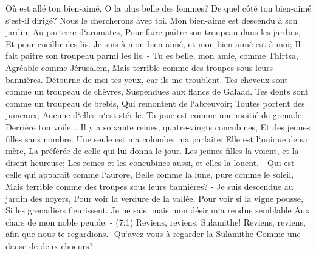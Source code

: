 \verse Où est allé ton bien-aimé, O la plus belle des femmes? De quel côté ton bien-aimé s`est-il dirigé? Nous le chercherons avec toi. 
\verse Mon bien-aimé est descendu à son jardin, Au parterre d`aromates, Pour faire paître son troupeau dans les jardins, Et pour cueillir des lis. 
\verse Je suis à mon bien-aimé, et mon bien-aimé est à moi; Il fait paître son troupeau parmi les lis. - 
\verse Tu es belle, mon amie, comme Thirtsa, Agréable comme Jérusalem, Mais terrible comme des troupes sous leurs bannières. 
\verse Détourne de moi tes yeux, car ils me troublent. Tes cheveux sont comme un troupeau de chèvres, Suspendues aux flancs de Galaad. 
\verse Tes dents sont comme un troupeau de brebis, Qui remontent de l`abreuvoir; Toutes portent des jumeaux, Aucune d`elles n`est stérile. 
\verse Ta joue est comme une moitié de grenade, Derrière ton voile... 
\verse Il y a soixante reines, quatre-vingts concubines, Et des jeunes filles sans nombre. 
\verse Une seule est ma colombe, ma parfaite; Elle est l`unique de sa mère, La préférée de celle qui lui donna le jour. Les jeunes filles la voient, et la disent heureuse; Les reines et les concubines aussi, et elles la louent. - 
\verse Qui est celle qui apparaît comme l`aurore, Belle comme la lune, pure comme le soleil, Mais terrible comme des troupes sous leurs bannières? - 
\verse Je suis descendue au jardin des noyers, Pour voir la verdure de la vallée, Pour voir si la vigne pousse, Si les grenadiers fleurissent. 
\verse Je ne sais, mais mon désir m`a rendue semblable Aux chars de mon noble peuple. - 
\verse (7:1) Reviens, reviens, Sulamithe! Reviens, reviens, afin que nous te regardions. -Qu`avez-vous à regarder la Sulamithe Comme une danse de deux choeurs? 

\chapter{}

